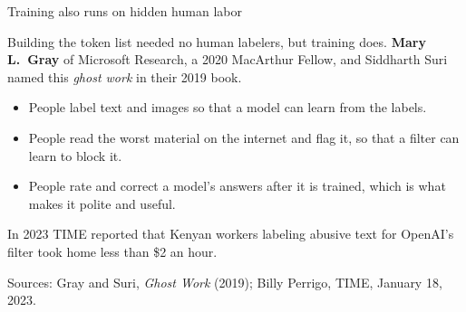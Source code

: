 \documentclass[aspectratio=169,11pt]{beamer}
\begin{document}
\begin{frame}{Training also runs on hidden human labor}

Building the token list needed no human labelers, but training does.
\textbf{Mary L.\ Gray} of Microsoft Research, a 2020 MacArthur Fellow, and Siddharth Suri named this \emph{ghost work} in their 2019 book.

\vspace{0.1cm}

\begin{itemize}\setlength\itemsep{0.35em}
    \item People label text and images so that a model can learn from the labels.
    \item People read the worst material on the internet and flag it, so that a filter can learn to block it.
    \item People rate and correct a model's answers after it is trained, which is what makes it polite and useful.
\end{itemize}

\vspace{0.25cm}

\alert{In 2023 TIME reported that Kenyan workers labeling abusive text for OpenAI's filter took home less than \$2 an hour.}

\vspace{0.05cm}
{\scriptsize\color{warmgray}Sources: Gray and Suri, \emph{Ghost Work} (2019); Billy Perrigo, TIME, January 18, 2023.}

\end{frame}
\end{document}
